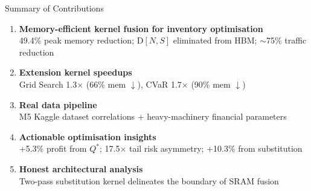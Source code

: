 \documentclass[aspectratio=169, 11pt]{beamer}
\begin{document}
\begin{frame}{Summary of Contributions}
\begin{enumerate}
    \item \textbf{Memory-efficient kernel fusion for inventory optimisation}\\
    49.4\% peak memory reduction; D$[N,S]$ eliminated from HBM; $\sim$75\% traffic reduction
    \vspace{0.3em}
    \item \textbf{Extension kernel speedups}\\
    Grid Search 1.3$\times$ (66\% mem $\downarrow$), CVaR 1.7$\times$ (90\% mem $\downarrow$)
    \vspace{0.3em}
    \item \textbf{Real data pipeline}\\
    M5 Kaggle dataset correlations + heavy-machinery financial parameters
    \vspace{0.3em}
    \item \textbf{Actionable optimisation insights}\\
    +5.3\% profit from $Q^*$; 17.5$\times$ tail risk asymmetry; +10.3\% from substitution
    \vspace{0.3em}
    \item \textbf{Honest architectural analysis}\\
    Two-pass substitution kernel delineates the boundary of SRAM fusion
\end{enumerate}
\end{frame}
\end{document}
